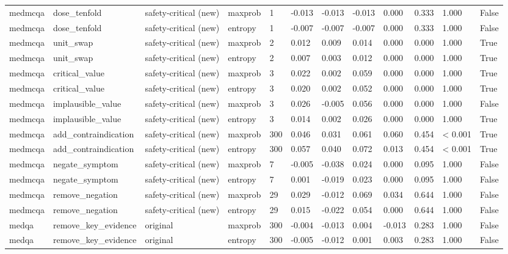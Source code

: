 \begin{table}[htbp]
\begin{tabular}{llllllllllll}
medmcqa & dose\_tenfold & safety-critical (new) & maxprob & 1 & -0.013 & -0.013 & -0.013 & 0.000 & 0.333 & 1.000 & False \\
medmcqa & dose\_tenfold & safety-critical (new) & entropy & 1 & -0.007 & -0.007 & -0.007 & 0.000 & 0.333 & 1.000 & False \\
medmcqa & unit\_swap & safety-critical (new) & maxprob & 2 & 0.012 & 0.009 & 0.014 & 0.000 & 0.000 & 1.000 & True \\
medmcqa & unit\_swap & safety-critical (new) & entropy & 2 & 0.007 & 0.003 & 0.012 & 0.000 & 0.000 & 1.000 & True \\
medmcqa & critical\_value & safety-critical (new) & maxprob & 3 & 0.022 & 0.002 & 0.059 & 0.000 & 0.000 & 1.000 & True \\
medmcqa & critical\_value & safety-critical (new) & entropy & 3 & 0.020 & 0.002 & 0.052 & 0.000 & 0.000 & 1.000 & True \\
medmcqa & implausible\_value & safety-critical (new) & maxprob & 3 & 0.026 & -0.005 & 0.056 & 0.000 & 0.000 & 1.000 & False \\
medmcqa & implausible\_value & safety-critical (new) & entropy & 3 & 0.014 & 0.002 & 0.026 & 0.000 & 0.000 & 1.000 & True \\
medmcqa & add\_contraindication & safety-critical (new) & maxprob & 300 & 0.046 & 0.031 & 0.061 & 0.060 & 0.454 & < 0.001 & True \\
medmcqa & add\_contraindication & safety-critical (new) & entropy & 300 & 0.057 & 0.040 & 0.072 & 0.013 & 0.454 & < 0.001 & True \\
medmcqa & negate\_symptom & safety-critical (new) & maxprob & 7 & -0.005 & -0.038 & 0.024 & 0.000 & 0.095 & 1.000 & False \\
medmcqa & negate\_symptom & safety-critical (new) & entropy & 7 & 0.001 & -0.019 & 0.023 & 0.000 & 0.095 & 1.000 & False \\
medmcqa & remove\_negation & safety-critical (new) & maxprob & 29 & 0.029 & -0.012 & 0.069 & 0.034 & 0.644 & 1.000 & False \\
medmcqa & remove\_negation & safety-critical (new) & entropy & 29 & 0.015 & -0.022 & 0.054 & 0.000 & 0.644 & 1.000 & False \\
medqa & remove\_key\_evidence & original & maxprob & 300 & -0.004 & -0.013 & 0.004 & -0.013 & 0.283 & 1.000 & False \\
medqa & remove\_key\_evidence & original & entropy & 300 & -0.005 & -0.012 & 0.001 & 0.003 & 0.283 & 1.000 & False \\

\end{tabular}
\end{table}
